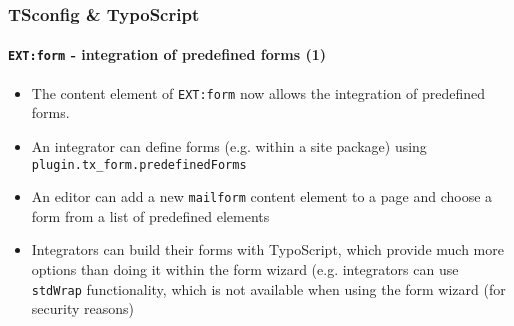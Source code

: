 \begin{frame}[fragile]
	\frametitle{TSconfig \& TypoScript}
	\framesubtitle{\texttt{EXT:form} - integration of predefined forms (1)}

	\lstset{basicstyle=\tiny\ttfamily}

	\begin{itemize}

		\item The content element of \texttt{EXT:form} now allows the integration of
			predefined forms.

		\item An integrator can define forms (e.g. within a site package) using
			\texttt{plugin.tx\_form.predefinedForms}

		\item An editor can add a new \texttt{mailform} content element to a page and
			choose a form from a list of predefined elements

		\item Integrators can build their forms with TypoScript, which provide much more
			options than doing it within the form wizard (e.g. integrators can
			use \texttt{stdWrap} functionality, which is not available when using the
			form wizard (for security reasons)

	\end{itemize}

\end{frame}

